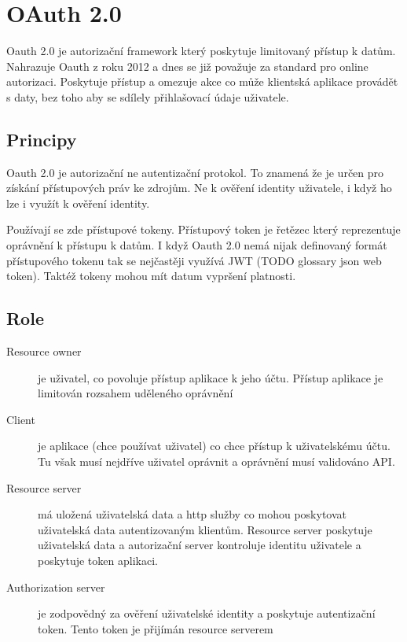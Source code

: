 \section{OAuth 2.0}
Oauth 2.0 je autorizační framework který poskytuje limitovaný přístup k datům. Nahrazuje Oauth z roku 2012 a dnes se již považuje za standard pro online autorizaci. Poskytuje přístup a omezuje akce co může klientská aplikace provádět s daty, bez toho aby se sdílely přihlašovací údaje uživatele.


\subsection{Principy}
Oauth 2.0 je autorizační ne autentizační protokol. To znamená že je určen pro získání přístupových práv ke zdrojům. Ne k ověření identity uživatele, i když ho lze i využít k ověření identity.

Používají se zde přístupové tokeny. Přístupový token je řetězec který reprezentuje oprávnění k přístupu k datům. I když Oauth 2.0 nemá nijak definovaný formát přístupového tokenu tak se nejčastěji využívá JWT (TODO glossary json web token). Taktéž tokeny mohou mít datum vypršení platnosti.

\subsection{Role}\label{sec:Oauth_roles}


\begin{description}
    \item[Resource owner] je uživatel, co povoluje přístup aplikace k jeho účtu. Přístup aplikace je limitován rozsahem uděleného oprávnění
    \item[Client] je aplikace (chce používat uživatel) co chce přístup k uživatelskému účtu. Tu však musí nejdříve uživatel oprávnit a oprávnění musí validováno API.
    \item[Resource server] má uložená uživatelská data a http služby co mohou poskytovat uživatelská data autentizovaným klientům. Resource server poskytuje uživatelská data a autorizační server kontroluje identitu uživatele a poskytuje token aplikaci.
    \item[Authorization server] je zodpovědný za ověření uživatelské identity a poskytuje autentizační token. Tento token je přijímán resource serverem
\end{description}

